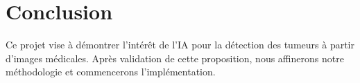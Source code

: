 \documentclass[a4paper,12pt]{article}
\begin{document}
\section{Conclusion}
Ce projet vise à démontrer l'intérêt de l'IA pour la détection des tumeurs à partir d'images médicales. Après validation de cette proposition, nous affinerons notre méthodologie et commencerons l'implémentation.

\newpage


\end{document}
